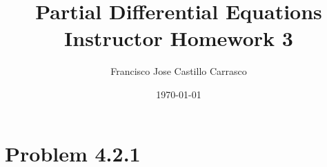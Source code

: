 




\title{Partial Differential Equations\\Instructor Homework 3}
\author{Francisco Jose Castillo Carrasco}
\date{\today}
\maketitle




\section*{Problem 4.2.1}


